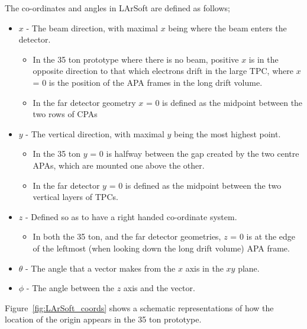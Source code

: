 The co-ordinates and angles in LArSoft are defined as follows;
\begin{itemize}
\item $x$ - The beam direction, with maximal $x$ being where the beam enters the detector.
  \begin{itemize}
  \item In the 35 ton prototype where there is no beam, positive $x$ is in the opposite direction to that which electrons drift in the large TPC, where $x$ = 0 is the position of the APA frames in the long drift volume.
  \item In the far detector geometry $x$ = 0 is defined as the midpoint between the two rows of CPAs 
  \end{itemize}
\item $y$ - The vertical direction, with maximal $y$ being the most highest point.
  \begin{itemize}
  \item In the 35 ton $y$ = 0 is halfway between the gap created by the two centre APAs, which are mounted one above the other.
  \item In the far detector $y$ = 0 is defined as the midpoint between the two vertical layers of TPCs.
  \end {itemize}
\item $z$ - Defined so as to have a right handed co-ordinate system.
  \begin{itemize}
  \item In both the 35 ton, and the far detector geometries, $z$ = 0 is at the edge of the leftmost (when looking down the long drift volume) APA frame.
  \end{itemize}
\item $\theta$ - The angle that a vector makes from the $x$ axis in the $xy$ plane.
\item $\phi$ - The angle between the $z$ axis and the vector.
\end{itemize}
Figure~\ref{fig:LArSoft_coords} shows a schematic representations of how the location of the origin appears in the 35 ton prototype.\\

